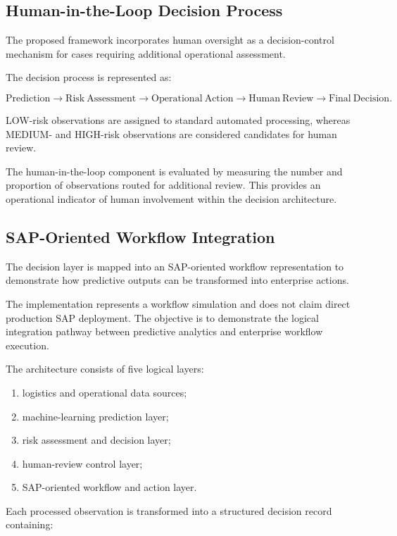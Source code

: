 \documentclass[11pt,a4paper]{article}
\begin{document}
\subsection{Human-in-the-Loop Decision Process}

The proposed framework incorporates human oversight as a decision-control mechanism for cases requiring additional operational assessment.

The decision process is represented as:

\[
\mathrm{Prediction}
\rightarrow
\mathrm{Risk\ Assessment}
\rightarrow
\mathrm{Operational\ Action}
\rightarrow
\mathrm{Human\ Review}
\rightarrow
\mathrm{Final\ Decision}.
\]

LOW-risk observations are assigned to standard automated processing, whereas MEDIUM- and HIGH-risk observations are considered candidates for human review.

The human-in-the-loop component is evaluated by measuring the number and proportion of observations routed for additional review. This provides an operational indicator of human involvement within the decision architecture.


\subsection{SAP-Oriented Workflow Integration}

The decision layer is mapped into an SAP-oriented workflow representation to demonstrate how predictive outputs can be transformed into enterprise actions.

The implementation represents a workflow simulation and does not claim direct production SAP deployment. The objective is to demonstrate the logical integration pathway between predictive analytics and enterprise workflow execution.

The architecture consists of five logical layers:

\begin{enumerate}
    \item logistics and operational data sources;
    \item machine-learning prediction layer;
    \item risk assessment and decision layer;
    \item human-review control layer;
    \item SAP-oriented workflow and action layer.
\end{enumerate}

Each processed observation is transformed into a structured decision record containing:
\end{document}
